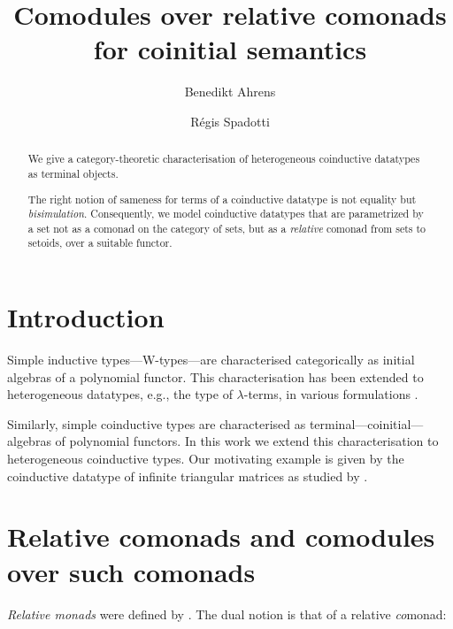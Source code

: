 \documentclass{amsart}
\author{Benedikt Ahrens}
\author{R\'egis Spadotti}
\title[Comodules over relative comonads for coinitial semantics]{Comodules over relative comonads \\ for coinitial semantics}
\begin{document}
\begin{abstract}
  We give a category-theoretic characterisation of heterogeneous coinductive datatypes as terminal objects.
  
  The right notion of sameness for terms of a coinductive datatype is not equality but \emph{bisimulation}.
  Consequently, we model coinductive datatypes that are parametrized by a set not as a comonad on the category of sets,
  but as a \emph{relative} comonad from sets to setoids, over a suitable functor.
\end{abstract}

\maketitle


\section{Introduction}

 Simple inductive types---\textsf{W}-types---are characterised categorically as initial algebras of
 a polynomial functor.
 This characterisation has been extended to heterogeneous datatypes, e.g., the type of $\lambda$-terms,
 in various formulations \parencite{fpt, ahrens_relmonads}.
 
 Similarly, simple coinductive types are characterised as terminal---coinitial---algebras of polynomial functors.
 In this work we extend this characterisation to heterogeneous coinductive types.
 Our motivating example is given by the coinductive datatype of infinite triangular matrices as studied by
 \textcite{DBLP:conf/types/MatthesP11}.


\section{Relative comonads and comodules over such comonads}

\emph{Relative monads} were defined by \textcite{DBLP:conf/fossacs/AltenkirchCU10}.
The dual notion is that of a relative \emph{co}monad:
\end{document}

